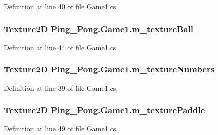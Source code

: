 Definition at line 40 of file Game1.\-cs.

\hypertarget{class_ping___pong_1_1_game1_aeb0aebe72aa99d1d627260de5d1beafb}{
\subsubsection[{m\-\_\-texture\-Ball}]{\setlength{\rightskip}{0pt plus 5cm}Texture2\-D Ping\-\_\-\-Pong.\-Game1.\-m\-\_\-texture\-Ball\hspace{0.3cm}{\ttfamily [private]}}}\label{class_ping___pong_1_1_game1_aeb0aebe72aa99d1d627260de5d1beafb}


Definition at line 44 of file Game1.\-cs.

\hypertarget{class_ping___pong_1_1_game1_a7919de4eb9687284ff736962adc6d180}{
\subsubsection[{m\-\_\-texture\-Numbers}]{\setlength{\rightskip}{0pt plus 5cm}Texture2\-D Ping\-\_\-\-Pong.\-Game1.\-m\-\_\-texture\-Numbers\hspace{0.3cm}{\ttfamily [private]}}}\label{class_ping___pong_1_1_game1_a7919de4eb9687284ff736962adc6d180}


Definition at line 39 of file Game1.\-cs.

\hypertarget{class_ping___pong_1_1_game1_a2b0b61d9c93d9d11781d2d4a3c6f50d4}{
\subsubsection[{m\-\_\-texture\-Paddle}]{\setlength{\rightskip}{0pt plus 5cm}Texture2\-D Ping\-\_\-\-Pong.\-Game1.\-m\-\_\-texture\-Paddle\hspace{0.3cm}{\ttfamily [private]}}}\label{class_ping___pong_1_1_game1_a2b0b61d9c93d9d11781d2d4a3c6f50d4}


Definition at line 49 of file Game1.\-cs.


